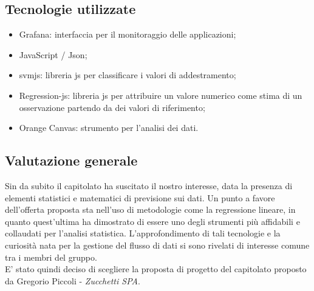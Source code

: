 \subsection{Tecnologie utilizzate}
\begin{itemize}
\item Grafana: interfaccia per il monitoraggio delle applicazioni;
\item JavaScript / Json;
\item svmjs: libreria js per classificare i valori di addestramento;
\item Regression-js: libreria js per attribuire un valore numerico come stima di un osservazione partendo da dei valori di riferimento;
\item Orange Canvas: strumento per l’analisi dei dati.
\end{itemize}

\subsection{Valutazione generale}
Sin da subito il capitolato ha suscitato il nostro interesse, data la presenza di elementi statistici e matematici di previsione sui dati.
Un punto a favore dell’offerta proposta sta nell’uso di metodologie come la regressione lineare, in quanto quest’ultima ha dimostrato di essere uno degli strumenti più affidabili e collaudati per l’analisi statistica. 
L’approfondimento di tali tecnologie e la curiosità nata per la gestione del flusso di dati si sono rivelati di interesse comune tra i membri del gruppo. \\
E’ stato quindi deciso di scegliere la proposta di progetto del capitolato proposto da Gregorio Piccoli - \textit{Zucchetti SPA}.




